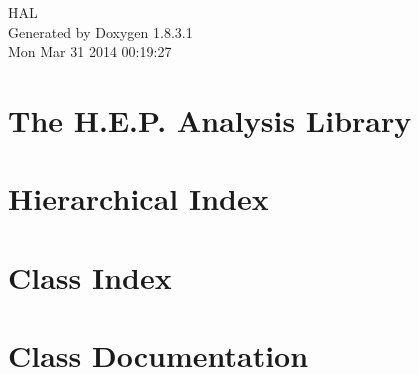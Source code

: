 \documentclass{book}
\begin{document}
\hypersetup{pageanchor=false,citecolor=blue}
\begin{titlepage}
\vspace*{7cm}
\begin{center}
{\Large H\-A\-L }\\
\vspace*{1cm}
{\large Generated by Doxygen 1.8.3.1}\\
\vspace*{0.5cm}
{\small Mon Mar 31 2014 00:19:27}\\
\end{center}
\end{titlepage}
\clearemptydoublepage
{}
\tableofcontents
\clearemptydoublepage
{}
\hypersetup{pageanchor=true,citecolor=blue}
\chapter{The H.\-E.\-P. Analysis Library}
\label{index}\hypertarget{index}{}
\chapter{Hierarchical Index}

\chapter{Class Index}

\chapter{Class Documentation}


























\printindex
\end{document}
